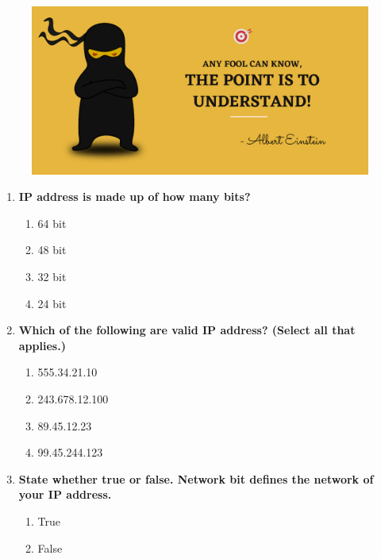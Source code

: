 \setlength{\columnsep}{3pt}
\begin{flushleft}
	
	\paragraph{}
	\bigskip
	
	\begin{figure}[h!]
		\centering
		\includegraphics[scale=.2]{content/practise.jpg}
	\end{figure}	
	\begin{enumerate}
		
		\item \textbf{IP address is made up of how many bits?}
		\begin{enumerate}[label=(\alph*)]
			\item 64 bit
			\item 48 bit
			\item 32 bit  %
			\item 24 bit
		\end{enumerate}
		\bigskip
		\bigskip
		
		\item \textbf{Which of the following are valid IP address? (Select all that applies.)}
		\begin{enumerate}[label=(\alph*)]
			\item 555.34.21.10
			\item 243.678.12.100
			\item 89.45.12.23    %
			\item 99.45.244.123  %
		\end{enumerate}
		\bigskip
		\bigskip	
		
		\item \textbf{State whether true or false. Network bit defines the network of your IP address.}
		\begin{enumerate}[label=(\alph*)]
			\item True  %
			\item False
		\end{enumerate}
		\bigskip
		\bigskip	


\end{enumerate}
\end{flushleft}
